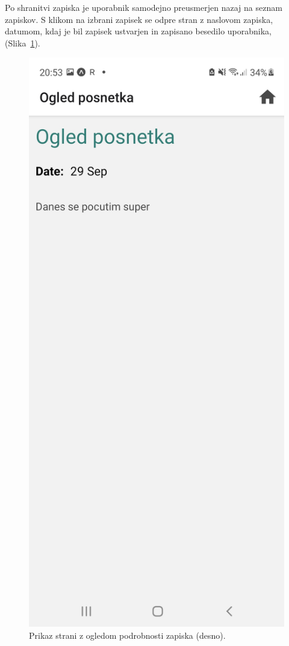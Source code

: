 \documentclass[a4paper, 12pt]{book}
\begin{document}
Po shranitvi zapiska je uporabnik samodejno preusmerjen nazaj na seznam zapiskov. 
S klikom na izbrani zapisek se odpre stran z naslovom zapiska, datumom, kdaj je bil zapisek ustvarjen in zapisano besedilo uporabnika, (Slika~\ref{zapiski2}).

\begin{figure}[!ht]
\centering
  \begin{minipage}[b]{0.45\textwidth}
    \includegraphics[width=\textwidth]{ogledzapiska.jpg}\centering
  \end{minipage}
    \caption{Prikaz strani z ogledom podrobnosti zapiska (desno).}
    \label{zapiski2}
\end{figure}
\end{document}
